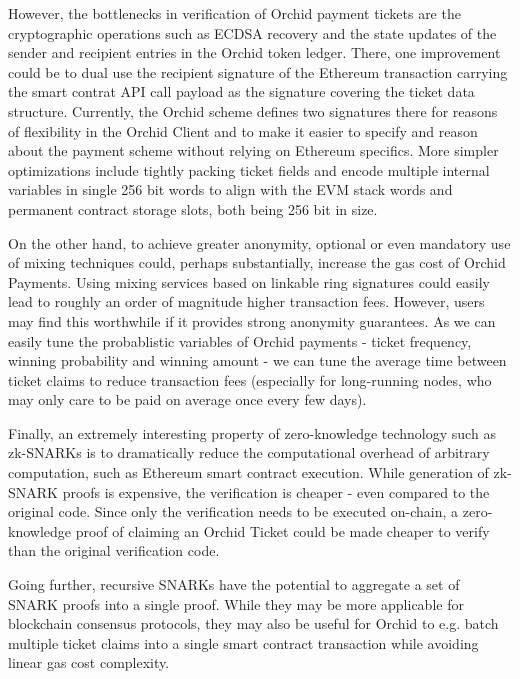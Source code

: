 However, the bottlenecks in verification of Orchid payment tickets are the cryptographic operations such as ECDSA recovery and the state updates of the sender and recipient entries in the Orchid token ledger. There, one improvement could be to dual use the recipient signature of the Ethereum transaction carrying the smart contrat API call payload as the signature covering the ticket data structure. Currently, the Orchid scheme defines two signatures there for reasons of flexibility in the Orchid Client and to make it easier to specify and reason about the payment scheme without relying on Ethereum specifics. More simpler optimizations include tightly packing ticket fields and encode multiple internal variables in single 256 bit words to align with the EVM stack words and permanent contract storage slots, both being 256 bit in size.

On the other hand, to achieve greater anonymity, optional or even mandatory use of mixing techniques could, perhaps substantially, increase the gas cost of Orchid Payments. Using mixing services based on linkable ring signatures could easily lead to roughly an order of magnitude higher transaction fees\cite{ETHRingSigs}. However, users may find this worthwhile if it provides strong anonymity guarantees. As we can easily tune the probablistic variables of Orchid payments - ticket frequency, winning probability and winning amount - we can tune the average time between ticket claims to reduce transaction fees (especially for long-running nodes, who may only care to be paid on average once every few days).

Finally, an extremely interesting property of zero-knowledge technology such as zk-SNARKs is to dramatically reduce the computational overhead of arbitrary computation, such as Ethereum smart contract execution\cite{zksnarks-blockchain}. While generation of zk-SNARK proofs is expensive, the verification is cheaper - even compared to the original code. Since only the verification needs to be executed on-chain, a zero-knowledge proof of claiming an Orchid Ticket could be made cheaper to verify than the original verification code.

Going further, recursive SNARKs\cite{RecursiveSnarks} have the potential to aggregate a set of SNARK proofs into a single proof. While they may be more applicable for blockchain consensus protocols\cite{ScalingTezos}, they may also be useful for Orchid to e.g. batch multiple ticket claims into a single smart contract transaction while avoiding linear gas cost complexity.
